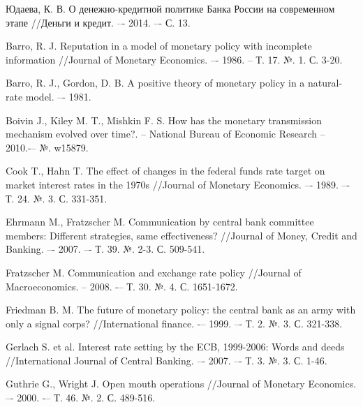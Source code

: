 \documentclass[14pt,a4paper, oneside]{extreport}
\theoremstyle{plain}              %
\theoremstyle{definition}         %
\begin{document}
\newpage



\renewcommand\bibname{Список литературы}

\begin{thebibliography}{99}

 Юдаева, К. В. О денежно-кредитной политике Банка России на современном этапе //Деньги и кредит. –- 2014. –- С. 13.

 Barro, R. J. Reputation in a model of monetary policy with incomplete information //Journal of Monetary Economics. –- 1986. -- Т. 17. №. 1. С. 3-20.

 Barro, R. J., Gordon, D. B. A positive theory of monetary policy in a natural-rate model. –- 1981.

 Boivin J., Kiley M. T., Mishkin F. S. How has the monetary transmission mechanism evolved over time?. – National Bureau of Economic Research -- 2010.-– №. w15879.

 Cook T., Hahn T. The effect of changes in the federal funds rate target on market interest rates in the 1970s //Journal of Monetary Economics. –- 1989. –- Т. 24. №. 3. С. 331-351.


 Ehrmann M., Fratzscher M. Communication by central bank committee members: Different strategies, same effectiveness? //Journal of Money, Credit and Banking. –- 2007. –- Т. 39. №. 2-3. С. 509-541.

 Fratzscher M. Communication and exchange rate policy //Journal of Macroeconomics. -- 2008. -– Т. 30. №. 4. С. 1651-1672.

 Friedman B. M. The future of monetary policy: the central bank as an army with only a signal corps? //International finance. -– 1999. –- Т. 2. №. 3. С. 321-338.

 Gerlach S. et al. Interest rate setting by the ECB, 1999-2006: Words and deeds //International Journal of Central Banking. –- 2007. –- Т. 3. №. 3. С. 1-46.

 Guthrie G., Wright J. Open mouth operations //Journal of Monetary Economics. –- 2000. -– Т. 46. №. 2. С. 489-516.


\end{thebibliography}
\end{document}
